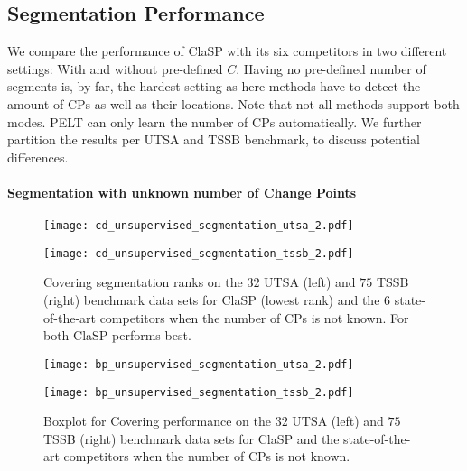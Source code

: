 \documentclass[pdflatex,sn-basic]{sn-jnl}
\begin{document}
\subsection{Segmentation Performance}
\label{sec:benchmark_segmentation}

We compare the performance of ClaSP with its six competitors in two different settings: With and without pre-defined $C$. Having no pre-defined number of segments is, by far, the hardest setting as here methods have to detect the amount of CPs as well as their locations. Note that not all methods support both modes. PELT can only learn the number of CPs automatically. We further partition the results per UTSA and TSSB benchmark, to discuss potential differences.

\paragraph{Segmentation with unknown number of Change Points}

\begin{figure}[t]
	\begin{minipage}{6cm}
        \texttt{[image: cd\_unsupervised\_segmentation\_utsa\_2.pdf]}
	\end{minipage}
	\begin{minipage}{6cm}
        \texttt{[image: cd\_unsupervised\_segmentation\_tssb\_2.pdf]}
	\end{minipage}
	\caption{Covering segmentation ranks on the $32$ UTSA (left) and $75$ TSSB (right) benchmark data sets for ClaSP (lowest rank) and the $6$ state-of-the-art competitors when the number of CPs is not known. For both ClaSP performs best.\label{fig:cd_unsupervised_seg}
	}
\end{figure}

\begin{figure}[t]
	\begin{minipage}{6cm}
        \texttt{[image: bp\_unsupervised\_segmentation\_utsa\_2.pdf]}
	\end{minipage}
	\begin{minipage}{6cm}
        \texttt{[image: bp\_unsupervised\_segmentation\_tssb\_2.pdf]}
	\end{minipage}
	\caption{Boxplot for Covering performance on the $32$ UTSA (left) and $75$ TSSB (right) benchmark data sets for ClaSP and the state-of-the-art competitors when the number of CPs is not known.\label{fig:boxplot_unsupervised_seg}
	}
\end{figure}
\end{document}
